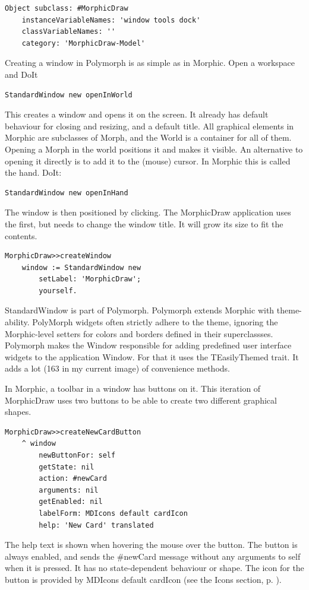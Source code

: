 \documentclass[10pt, twoside]{article}   	%
\begin{document}
\begin{verbatim}
Object subclass: #MorphicDraw
    instanceVariableNames: 'window tools dock'
    classVariableNames: ''
    category: 'MorphicDraw-Model'
\end{verbatim}

Creating a window in Polymorph is as simple as in Morphic. Open a workspace and DoIt
\begin{verbatim}
StandardWindow new openInWorld 
\end{verbatim} 
This creates a window and opens it on the screen. 
It already has default behaviour for closing and resizing, and a default title. 
All graphical elements in Morphic are subclasses of Morph, and the 
World is a container for all of them. Opening a Morph in the world
positions it and makes it visible. An alternative to opening it directly is
to add it to the (mouse) cursor. In Morphic this is called the hand.
DoIt:
\begin{verbatim}
StandardWindow new openInHand 
\end{verbatim} 
The window is then positioned by clicking.
\reversemarginpar
{}
The MorphicDraw application uses the first, but needs to change 
the window title. It will grow its size to fit the contents.

\begin{verbatim}
MorphicDraw>>createWindow
    window := StandardWindow new
        setLabel: 'MorphicDraw';
        yourself.
\end{verbatim}

StandardWindow is part of Polymorph. Polymorph extends Morphic
with theme-ability. PolyMorph widgets often strictly adhere to the theme,
ignoring the Morphic-level setters for colors and borders defined in
their superclassses.  Polymorph makes the 
Window responsible for adding predefined user interface widgets
to the application Window. For that it uses the TEasilyThemed 
trait. It adds a lot (163 in my current image) of convenience methods.

In Morphic, a toolbar in a window has buttons on it. This iteration of
MorphicDraw uses two buttons to be able to create two different 
graphical shapes.

\begin{verbatim}
MorphicDraw>>createNewCardButton
    ^ window
        newButtonFor: self
        getState: nil
        action: #newCard
        arguments: nil
        getEnabled: nil
        labelForm: MDIcons default cardIcon
        help: 'New Card' translated
\end{verbatim}
The help text is shown when hovering the mouse over the button.
The button is always enabled, and sends the \#newCard message 
without any arguments to self when it is pressed. It has no 
state-dependent behaviour or shape. The icon for the button
is provided by MDIcons default cardIcon (see the Icons section,  p. \pageref{Icons}).
\end{document}
